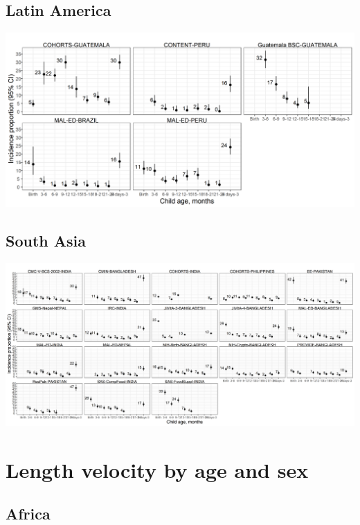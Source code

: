 \documentclass[9pt,]{book}
\begin{document}
\hypertarget{latin-america-2}{%
\subsection{Latin America}\label{latin-america-2}}

\includegraphics[width=41.67in]{figure-copies/fig-stunt-2-inc-cohort-latamer-allage-primary}

\hypertarget{south-asia-2}{%
\subsection{South Asia}\label{south-asia-2}}

\includegraphics[width=62.5in]{figure-copies/fig-stunt-2-inc-cohort-asia-allage-primary}

\hypertarget{length-velocity-by-age-and-sex}{%
\section{Length velocity by age and sex}\label{length-velocity-by-age-and-sex}}

\hypertarget{africa-3}{%
\subsection{Africa}\label{africa-3}}
\end{document}
